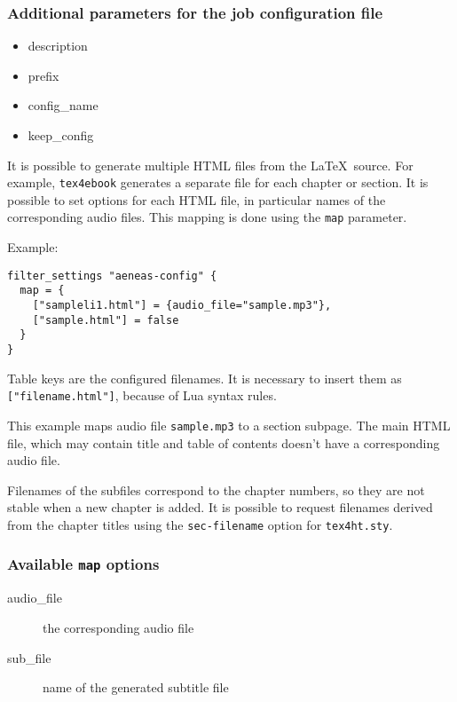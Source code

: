 \hypertarget{additional-parameters-for-the-job-configuration-file}{%
\subsubsection{Additional parameters for the job configuration
file}\label{additional-parameters-for-the-job-configuration-file}}

\begin{itemize}
\tightlist
\item
  description
\item
  prefix
\item
  config\_name
\item
  keep\_config
\end{itemize}

It is possible to generate multiple HTML files from the \LaTeX~source.
For example, \texttt{tex4ebook} generates a separate file for each
chapter or section. It is possible to set options for each HTML file, in
particular names of the corresponding audio files. This mapping is done
using the \texttt{map} parameter.

Example:

\begin{verbatim}
filter_settings "aeneas-config" {
  map = {
    ["sampleli1.html"] = {audio_file="sample.mp3"}, 
    ["sample.html"] = false
  }
}
\end{verbatim}

Table keys are the configured filenames. It is necessary to insert them
as \texttt{{[}"filename.html"{]}}, because of Lua syntax rules.

This example maps audio file \texttt{sample.mp3} to a section subpage.
The main HTML file, which may contain title and table of contents
doesn't have a corresponding audio file.

Filenames of the subfiles correspond to the chapter numbers, so they are
not stable when a new chapter is added. It is possible to request
filenames derived from the chapter titles using the
\texttt{sec-filename} option for \texttt{tex4ht.sty}.

\hypertarget{available-map-options}{%
\subsubsection{\texorpdfstring{Available \texttt{map}
options}{Available map options}}\label{available-map-options}}

\begin{description}
\item[audio\_file]
the corresponding audio file
\item[sub\_file]
name of the generated subtitle file
\end{description}

